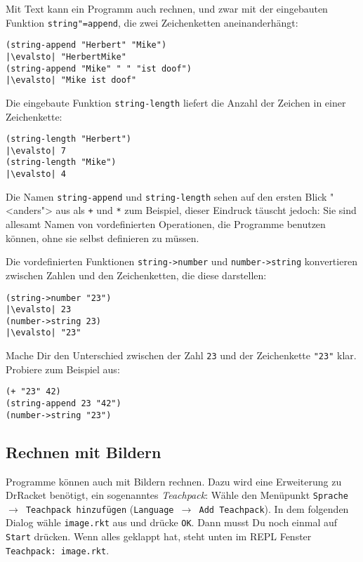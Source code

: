 Mit Text kann ein Programm auch rechnen, und zwar mit der eingebauten
Funktion
\texttt{string"=append},
die zwei Zeichenketten aneinanderhängt:
%
\begin{lstlisting}
(string-append "Herbert" "Mike")
|\evalsto| "HerbertMike"
(string-append "Mike" " " "ist doof")
|\evalsto| "Mike ist doof"
\end{lstlisting}
%
Die eingebaute Funktion
\lstinline{string-length}
liefert die Anzahl der Zeichen in einer Zeichenkette:
%
\begin{lstlisting}
(string-length "Herbert")
|\evalsto| 7
(string-length "Mike")
|\evalsto| 4
\end{lstlisting}
%
Die Namen \lstinline{string-append} und \lstinline{string-length} sehen auf
den ersten Blick "<anders"> aus als \lstinline{+} und \lstinline{*} zum
Beispiel, dieser Eindruck täuscht jedoch: Sie sind allesamt Namen von
vordefinierten Operationen, die Programme benutzen können, ohne sie
selbst definieren zu müssen.

Die vordefinierten Funktionen
\lstinline{string->number}
und \lstinline{number->string} konvertieren zwischen Zahlen und den
Zeichenketten, die diese darstellen:
%
\begin{lstlisting}
(string->number "23")
|\evalsto| 23
(number->string 23)
|\evalsto| "23"
\end{lstlisting}
%
\begin{aufgabeinline}
  Mache Dir den Unterschied zwischen der Zahl \lstinline{23} und der
  Zeichenkette \lstinline{"23"} klar.  Probiere zum Beispiel aus:
\begin{lstlisting}
(+ "23" 42)
(string-append 23 "42")
(number->string "23")
\end{lstlisting}
\end{aufgabeinline}

\subsection{Rechnen mit Bildern}
\label{sec:rechnen-mit-bildern}

Programme können auch mit Bildern rechnen.  Dazu wird eine Erweiterung
zu DrRacket benötigt, ein sogenanntes
\textit{Teachpack}: Wähle den Menüpunkt
\texttt{Sprache $\rightarrow$ Teachpack hinzufügen}
(\texttt{Language $\rightarrow$ Add Teachpack}).  In dem folgenden Dialog
wähle \texttt{image.rkt} aus und drücke 
\texttt{OK}.  Dann musst Du noch einmal auf \texttt{Start} drücken.
Wenn alles geklappt hat, steht unten im REPL Fenster
\texttt{Teachpack: image.rkt}.

